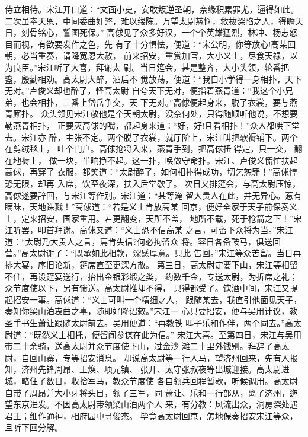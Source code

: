 侍立相待。宋江开口道：“文面小吏，安敢叛逆圣朝，奈缘积累罪尤，逼得如此。
二次虽奉天恩，中间委曲奸弊，难以缕陈。万望太尉慈悯，救拔深陷之人，得瞻天
日，刻骨铭心，誓图死保。”
高俅见了众多好汉，一个个英雄猛烈，林冲、杨志怒目而视，有欲要发作之色，先
有了十分惧怯，便道：“宋公明，你等放心!高某回朝，必当重奏，请降宽恩大赦，
前来招安，重赏加官，大小义士，尽食天禄，以为良臣。”宋江听了大喜，拜谢太
尉。当日筵会，甚是整齐，大小头领，轮番把盏，殷勤相劝。高太尉大醉，酒后不
觉放荡，便道：“我自小学得一身相扑，天下无对。”卢俊义却也醉了，怪高太尉
自夸天下无对，便指着燕青道：“我这个小兄弟，也会相扑，三番上岱岳争交，天
下无对。”高俅便起身来，脱了衣裳，要与燕青厮扑。
众头领见宋江敬他是个天朝太尉，没奈何处，只得随顺听他说，不想要勒燕青相扑，
正要灭高俅的嘴，都起身来道：“好，好!且看相扑！”众人都哄下堂去。宋江亦
醉，主张不定。两个脱了衣裳，就厅阶上，宋江叫把软褥铺下。两个在剪绒毯上，
吐个门户。高俅抢将入来，燕青手到，把高俅扭得定，只一交，翻在地褥上，
做一块，半晌挣不起。这一扑，唤做守命扑。宋江、卢俊义慌忙扶起高俅，再穿了
衣服，都笑道：“太尉醉了，如何相扑得成功，切乞恕罪！”高俅惶恐无限，却再
入席，饮至夜深，扶入后堂歇了。
次日又排筵会，与高太尉压惊，高俅遂要辞回，与宋江等作别。宋江道：“某等淹
留大贵人在此，并无异心。惹有瞒昧，天地诛戮！”高俅道：“若是义士肯放高某
回京，便好全家于天子前保奏义士，定来招安，国家重用。若更翻变，天所不盖，
地所不载，死于枪箭之下！”宋江听罢，叩首拜谢。高俅又道：“义士恐不信高某
之言，可留下众将为当。”宋江道：“太尉乃大贵人之言，焉肯失信?何必拘留众
将。容日各备鞍马，俱送回营。”高太尉谢了：“既承如此相款，深感厚意。只此
告回。”宋江等众苦留。当日再排大宴，序旧论新，筵席直至更深方散。
第三日，高太尉定要下山，宋江等相留不住，再设筵宴送行，抬出金银彩缎之类，
约数千金，专送太尉，为折席之礼；众节度使以下，另有馈送。高太尉推却不得，
只得都受了。饮酒中间，宋江又提起招安一事。高俅道：“义士可叫一个精细之人，
跟随某去，我直引他面见天子，奏知你梁山泊衷曲之事，随即好降诏敕。”宋江一
心只要招安，便与吴用计议，教圣手书生萧让跟随太尉前去。吴用便道：“再教铁
叫子乐和作伴，两个同去。”高太尉道：“既然义士相托，便留闻参谋在此为信。”
宋江大喜。至第四日，宋江与吴用带二十余骑，送高太尉并众节度使下山，过金沙
滩二十里外饯别。拜辞了高太尉，自回山寨，专等招安消息。
却说高太尉等一行人马，望济州回来，先有人报知，济州先锋周昂、王焕、项元镇、
张开、太守张叔夜等出城迎接。高太尉进城，略住了数日，收拾军马，教众节度使
各自领兵回程暂歇，听候调用。高太尉自带了周昂并大小牙将头目，领了三军，同
萧让、乐和一行部从，离了济州，迤望东京进发。不因高太尉带领梁山泊两个人
来，有分教：风流出众，洞房深处遇君王；细作通神，相府园中寻俊杰。
毕竟高太尉回京，怎地保奏招安宋江等众，且听下回分解。